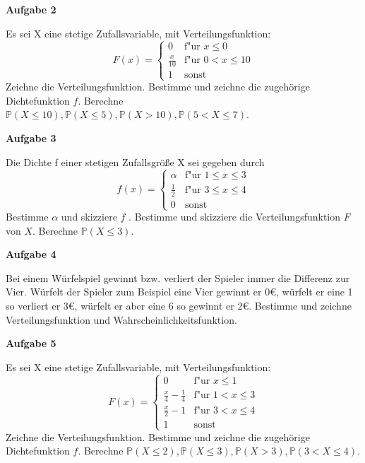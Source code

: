 \documentclass[a4paper,12pt]{article}
\newcommand{\Aufgabe}[1]{
  {
  \vspace*{0.5cm}
  \textsf{\textbf{Aufgabe #1}}
  \vspace*{0.2cm}
  
  }
}
\begin{document}
\Aufgabe{2}
Es sei X eine stetige Zufallsvariable, mit Verteilungsfunktion:
\begin{equation}
  F(x) = \begin{cases}
     0 & \text{f"ur } x \leq 0 \\
      \frac{x}{10}  & \text{f"ur } 0  < x \leq 10 \\
    1 & \text{sonst }  
   \end{cases}
\end{equation}
Zeichne die Verteilungsfunktion. Bestimme und zeichne die zugehörige Dichtefunktion $f$. Berechne $\mathbb{P}(X \leq 10), \mathbb{P}(X \leq 5),\mathbb{P}(X > 10),\mathbb{P}(5 < X \leq 7)$.

\Aufgabe{3}
Die Dichte f einer stetigen Zufallsgröße X sei gegeben durch 
\begin{equation}
   f(x) = \begin{cases}
     \alpha & \text{f"ur } 1 \leq x \le 3 \\
     \frac{1}{2} & \text{f"ur } 3 \leq x \le 4\\
    0 & \text{sonst }  
   \end{cases}
\end{equation}
Bestimme $ \alpha$ und skizziere $f$ .
Bestimme und skizziere die Verteilungsfunktion $F$ von $X$.
Berechne $\mathbb{P}(X \leq 3)$. \\

\Aufgabe{4}
Bei einem Würfelspiel gewinnt bzw. verliert der Spieler immer die Differenz zur Vier. Würfelt der Spieler zum Beispiel eine Vier gewinnt er 0€, würfelt er eine 1 so verliert er 3€, würfelt er aber eine 6 so gewinnt er 2€. Bestimme und zeichne Verteilungsfunktion und Wahrscheinlichkeitsfunktion.



\Aufgabe{5}
Es sei X eine stetige Zufallsvariable, mit Verteilungsfunktion:
\begin{equation}
  F(x) = \begin{cases}
     0 & \text{f"ur } x \leq 1 \\
      \frac{x}{4} -\frac{1}{4}    & \text{f"ur } 1  < x \leq 3 \\
       \frac{x}{2}  - 1  & \text{f"ur } 3 < x \leq 4 \\
    1 & \text{sonst }  
   \end{cases}
\end{equation}
Zeichne die Verteilungsfunktion. Bestimme und zeichne die zugehörige Dichtefunktion $f$. Berechne $\mathbb{P}(X \leq 2), \mathbb{P}(X \leq 3),\mathbb{P}(X > 3),\mathbb{P}(3 < X \leq 4)$.
\end{document}
